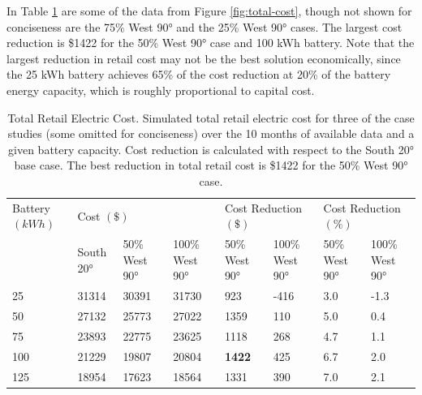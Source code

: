 \documentclass[journal,article,submit,pdftex,moreauthors]{Definitions/mdpi}
\begin{document}
In Table \ref{tab:total-cost} are some of the data from Figure \ref{fig:total-cost}, though not shown for conciseness are the 75\% West 90° and the 25\% West 90° cases. The largest cost reduction is \$1422 for the 50\% West 90° case and 100 kWh battery. Note that the largest reduction in retail cost may not be the best solution economically, since the 25 kWh battery achieves 65\% of the cost reduction at 20\% of the battery energy capacity, which is roughly proportional to capital cost.

\begin{table}[!h]
  \caption{Total Retail Electric Cost. Simulated total retail electric cost for three of the case studies (some omitted for conciseness) over the 10 months of available data and a given battery capacity. Cost reduction is calculated with respect to the South 20° base case. The best reduction in total retail cost is \$1422 for the 50\% West 90° case.}
  \label{tab:total-cost}
  \begin{tabularx}{\textwidth}{XXXXXXXX}
    \toprule
    Battery $(kWh)$ & \multicolumn{3}{l}{Cost $(\$)$} & \multicolumn{2}{l}{Cost Reduction $(\$)$} & \multicolumn{2}{l}{Cost Reduction $(\%)$}                                                                   \\
                    & South 20°                       & 50\% West 90°                             & 100\% West 90°                            & 50\% West 90° & 100\% West 90° & 50\% West 90° & 100\% West 90° \\
    \midrule
    25              & 31314                           & 30391                                     & 31730                                     & 923           & -416           & 3.0           & -1.3           \\
    50              & 27132                           & 25773                                     & 27022                                     & 1359          & 110            & 5.0           & 0.4            \\
    75              & 23893                           & 22775                                     & 23625                                     & 1118          & 268            & 4.7           & 1.1            \\
    100             & 21229                           & 19807                                     & 20804                                     & \textbf{1422} & 425            & 6.7           & 2.0            \\
    125             & 18954                           & 17623                                     & 18564                                     & 1331          & 390            & 7.0           & 2.1            \\

\end{tabularx}
\end{table}
\end{document}
